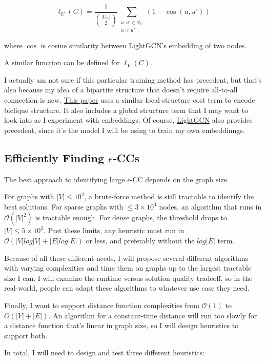 \documentclass{article}
\begin{document}
\[\ell_U(C) = \frac{1}{\binom{|U_C|}{2}}\sum_{\substack{u,u'\in S_C\\u<u'}}
\left(1-\cos(u,u')\right)\]

where $\cos$ is cosine similarity between LightGCN's embedding of two nodes.

A similar function can be defined for $\ell_V(C)$.

I actually am not sure if this particular training method has precedent, but that's also because my idea of a bipartite structure that doesn't require all-to-all connection is new. \href{https://academic.oup.com/bioinformatics/article/37/15/2190/6126796}{This paper} uses a similar local-structure cost term to encode biclique structure. It also includes a global structure term that I may want to look into as I experiment with embeddings. Of course, \href{https://dl.acm.org/doi/10.1145/3397271.3401063}{LightGCN} also provides precedent, since it's the model I will be using to train my own embeddinngs.

\subsection{Efficiently Finding $\epsilon$-CCs}

The best approach to identifying large $\epsilon$-CC depends on the graph size.

For graphs with $|V| \le 10^2$, a brute-force method is still tractable to identify the best solutions. For sparse graphs with $\le 3 \times 10^4$ nodes, an algorithm that runs in $\mathcal{O}(|V|^2)$ is tractable enough. For dense graphs, the threshold drops to $|V| \le 5 \times 10^2$. Past these limits, any heuristic must run in $\mathcal{O}(|V|log|V| + |E|log|E|)$ or less, and preferably without the $log|E|$ term.

Because of all these different needs, I will propose several different algorithms with varying complexities and time them on graphs up to the largest tractable size I can. I will examine the runtime versus solution quality tradeoff, so in the real-world, people can adapt these algorithms to whatever use case they need.

Finally, I want to support distance function complexities from $\mathcal{O}(1)$ to $O(|V| + |E|)$. An algorithm for a constant-time distance will run too slowly for a distance function that's linear in graph size, so I will design heuristics to support both.

In total, I will need to design and test three different heuristics:
\end{document}
